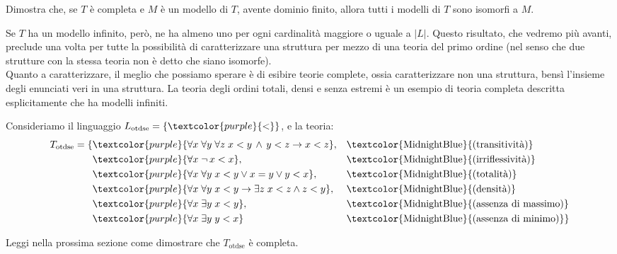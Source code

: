 \begin{exercise}
    Dimostra che, se $T$ è completa e $M$ è un modello di $T$, avente dominio finito, allora tutti i modelli di $T$ sono isomorfi a $M$.
\end{exercise}

Se $T$ ha un modello infinito, però, ne ha almeno uno per ogni cardinalità maggiore o uguale a $|L|$. Questo risultato, che vedremo più avanti,
preclude una volta per tutte la possibilità di caratterizzare una struttura per mezzo di una teoria del primo ordine (nel senso che due strutture con la stessa teoria non è detto che siano isomorfe).\\
Quanto a caratterizzare, il meglio che possiamo sperare è di esibire teorie complete, ossia caratterizzare non una struttura, bensì l'insieme degli enunciati veri in una struttura. La teoria degli ordini totali,
densi e senza estremi è un esempio di teoria completa descritta esplicitamente che ha modelli infiniti.

\begin{example}
    Consideriamo il linguaggio $L_{\text{otdse}} = \{\textcolor{purple}{<}\}$, e la teoria:
    \begin{align*}
        T_{\text{otdse}} = \{& \textcolor{purple}{\forall x \; \forall y \; \forall z \; x < y \,\land\, y < z \to x < z}, &&\text{\textcolor{MidnightBlue}{(transitività)}} \\
        & \textcolor{purple}{\forall x \; \neg \,x < x}, &&\text{\textcolor{MidnightBlue}{(irriflessività)}} \\
        & \textcolor{purple}{\forall x \; \forall y \; x < y \lor x = y \lor y < x}, &&\text{\textcolor{MidnightBlue}{(totalità)}} \\
        & \textcolor{purple}{\forall x \; \forall y \; x < y \to \exists z \; x < z \land z < y}, &&\text{\textcolor{MidnightBlue}{(densità)}} \\
        & \textcolor{purple}{\forall x \; \exists y \; x < y}, &&\text{\textcolor{MidnightBlue}{(assenza di massimo)}} \\
        & \textcolor{purple}{\forall x \; \exists y \; y < x} &&\text{\textcolor{MidnightBlue}{(assenza di minimo)}} \}
    \end{align*}
\end{example}

\begin{exercise}
    Leggi nella prossima sezione come dimostrare che $T_{\text{otdse}}$ è completa.
\end{exercise}
